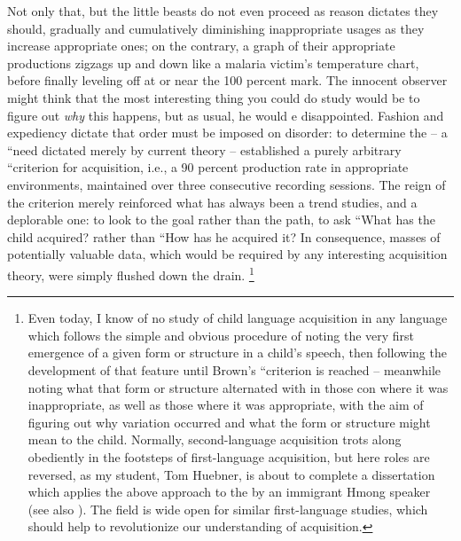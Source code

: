 Not only that, but the little beasts do not even proceed as reason dictates they should, gradually and cumulatively diminishing inappropriate usages as they increase appropriate ones; on the contrary, a graph of their appropriate productions zigzags up and down like a malaria victim's temperature chart, before finally leveling off at or near the 100 percent mark. The innocent observer might think that the most interesting thing you could do  study would be to figure out \textit{why} this happens, but as usual, he would e disappointed. Fashion and expediency dictate that order must be imposed on disorder: to determine the  -- a ``need dictated merely by current theory -- \citet{Brown1973} established a purely arbitrary ``criterion for acquisition, i.e., a 90 percent production rate in appropriate environments, maintained over three consecutive recording sessions. The reign of the criterion merely reinforced what has always been
a trend  studies, and a deplorable one: to look to the goal rather than the path, to ask ``What has the child acquired? rather than ``How has he acquired it? In consequence, masses of potentially valuable data, which would be required by any interesting acquisition theory, were simply flushed down the drain.
\footnote{Even today, I know of no study of child language acquisition in any language which follows the simple and obvious procedure of noting the very first emergence of a given form or structure in a child's speech, then following the development of that feature until Brown's ``criterion is reached -- meanwhile noting what that form or structure alternated with in those con where it was inappropriate, as well as those where it was appropriate, with the aim of figuring out why variation occurred and what the form or structure might mean to the child. Normally, second-language acquisition trots along obediently in the footsteps of first-language acquisition, but here roles are reversed, as my student, Tom Huebner, is about to complete a dissertation which applies the above approach to the   by an immigrant Hmong speaker (see also \citealt{Huebner1979}). The field is wide open for similar first-language studies, which should help to revolutionize our understanding of acquisition.\label{Fn1}}

